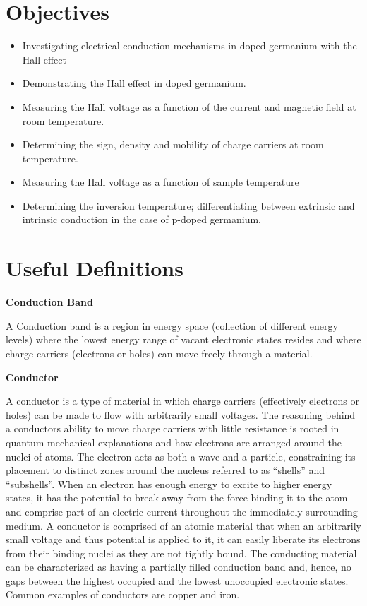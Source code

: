 \documentclass{../lab}
\begin{document}
\section{Objectives}

\begin{itemize}
    \item Investigating electrical conduction mechanisms in doped germanium with the Hall effect

    \item Demonstrating the Hall effect in doped germanium.

    \item Measuring the Hall voltage as a function of the current and magnetic field at room temperature.

    \item Determining the sign, density and mobility of charge carriers at room temperature.

    \item Measuring the Hall voltage as a function of sample temperature

    \item Determining the inversion temperature; differentiating between extrinsic and intrinsic conduction in the case of p-doped germanium.

\end{itemize}

\section{Useful Definitions}

\textbf{Conduction Band}

A Conduction band is a region in energy space (collection of different energy levels) where the lowest energy range of vacant electronic states resides and where charge carriers (electrons or holes) can move freely through a material.

\textbf{Conductor}

A conductor is a type of material in which charge carriers (effectively electrons or holes) can be made to flow with arbitrarily small voltages. The reasoning behind a conductors ability to move charge carriers with little resistance is rooted in quantum mechanical explanations and how electrons are arranged around the nuclei of atoms. The electron acts as both a wave and a particle, constraining its placement to distinct zones around the nucleus referred to as ``shells'' and ``subshells''. When an electron has enough energy to excite to higher energy states, it has the potential to break away from the force binding it to the atom and comprise part of an electric current throughout the immediately surrounding medium. A conductor is comprised of an atomic material that when an arbitrarily small voltage and thus potential is applied to it, it can easily liberate its electrons from their binding nuclei as they are not tightly bound.  The conducting material can be characterized as having a partially filled conduction band and, hence, no gaps between the highest occupied and the lowest unoccupied electronic states. Common examples of conductors are copper and iron.
\end{document}
